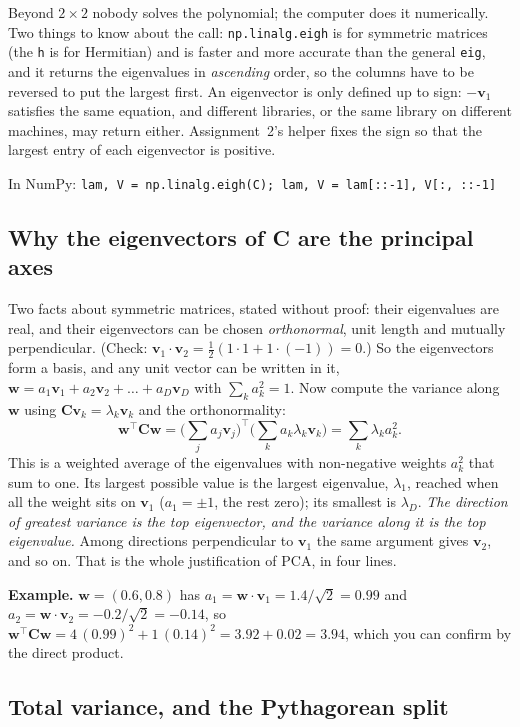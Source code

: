 \documentclass[11pt]{article}
\newcommand{\vw}{\bm{w}}
\newcommand{\vv}{\bm{v}}
\newcommand{\mC}{\bm{C}}
\newcommand{\np}[1]{{\small\color{lightgray}In NumPy: \texttt{#1}}\par}
\begin{document}
Beyond $2\times2$ nobody solves the polynomial; the computer does it numerically. Two things
to know about the call: \texttt{np.linalg.eigh} is for symmetric matrices (the \texttt{h}
is for Hermitian) and is faster and more accurate than the general \texttt{eig}, and it
returns the eigenvalues in \emph{ascending} order, so the columns have to be reversed to
put the largest first. An eigenvector is only defined up to sign: $-\vv_1$ satisfies the
same equation, and different libraries, or the same library on different machines, may
return either. Assignment~2's helper fixes the sign so that the largest entry of each
eigenvector is positive.

\np{lam, V = np.linalg.eigh(C); lam, V = lam[::-1], V[:, ::-1]}

\subsection{Why the eigenvectors of C are the principal axes}
\label{sec:why}

Two facts about symmetric matrices, stated without proof: their eigenvalues are real, and
their eigenvectors can be chosen \emph{orthonormal}, unit length and mutually
perpendicular. (Check: $\vv_1\cdot\vv_2 = \tfrac12(1\cdot1 + 1\cdot(-1)) = 0$.) So the
eigenvectors form a basis, and any unit vector can be written in it,
$\vw = a_1\vv_1 + a_2\vv_2 + \dots + a_D\vv_D$ with $\sum_k a_k^2 = 1$. Now compute the
variance along $\vw$ using $\mC\vv_k = \lambda_k\vv_k$ and the orthonormality:
\[
\vw^{\top}\mC\vw = \Big(\sum_j a_j\vv_j\Big)^{\top}\Big(\sum_k a_k\lambda_k\vv_k\Big)
= \sum_k \lambda_k a_k^2 .
\]
This is a weighted average of the eigenvalues with non-negative weights $a_k^2$ that sum
to one. Its largest possible value is the largest eigenvalue, $\lambda_1$, reached when all
the weight sits on $\vv_1$ ($a_1 = \pm1$, the rest zero); its smallest is $\lambda_D$.
\emph{The direction of greatest variance is the top eigenvector, and the variance along it
is the top eigenvalue.} Among directions perpendicular to $\vv_1$ the same argument gives
$\vv_2$, and so on. That is the whole justification of PCA, in four lines.

\textbf{Example.} $\vw = (0.6, 0.8)$ has $a_1 = \vw\cdot\vv_1 = 1.4/\sqrt2 = 0.99$ and
$a_2 = \vw\cdot\vv_2 = -0.2/\sqrt2 = -0.14$, so
$\vw^{\top}\mC\vw = 4\,(0.99)^2 + 1\,(0.14)^2 = 3.92 + 0.02 = 3.94$, which you can confirm
by the direct product.

\subsection{Total variance, and the Pythagorean split}
\end{document}
